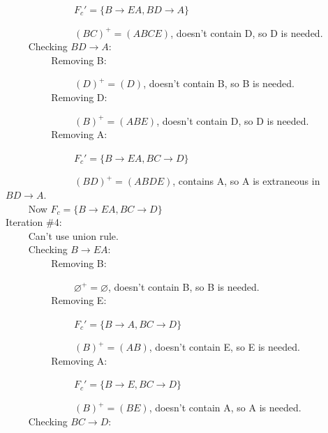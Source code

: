 \documentclass[a4paper]{article}
\begin{document}
	~~~~ ~~~~ ~~~~ $ F_c'=\{B\rightarrow EA, BD \rightarrow A\}$ 
	
	~~~~ ~~~~ ~~~~ $ (BC)^+=(ABCE) $, doesn't contain D, so D is needed. \\
		
	~~~~ Checking $BD\rightarrow A:$  \\
		
	~~~~ ~~~~ Removing B: 
	
	~~~~ ~~~~ ~~~~ $ (D)^+=(D) $, doesn't contain B, so B is needed. \\
		
	~~~~ ~~~~ Removing D: 
	
	~~~~ ~~~~ ~~~~ $ (B)^+=(ABE) $, doesn't contain D, so D is needed. \\
		
	~~~~ ~~~~ Removing A: 
	
	~~~~ ~~~~ ~~~~ $ F_c'=\{B\rightarrow EA, BC \rightarrow D\}$ 
	
	~~~~ ~~~~ ~~~~ $ (BD)^+=(ABDE) $, contains A, so A is extraneous in $BD\rightarrow A$. \\ 
	
	~~~~ Now $F_c = \{B \rightarrow EA, BC \rightarrow D\}$ \\
	
	Iteration \#4: \\
	
	~~~~ Can't use union rule. \\
	
	~~~~ Checking $B\rightarrow EA:$ \\ 
		
	~~~~ ~~~~ Removing B: 
	
	~~~~ ~~~~ ~~~~ $ \varnothing^+=\varnothing $, doesn't contain B, so B is needed. \\
		
	~~~~ ~~~~ Removing E: 
	
	~~~~ ~~~~ ~~~~ $ F_c'=\{B \rightarrow A, BC \rightarrow D\}$ 
	
	~~~~ ~~~~ ~~~~ $ (B)^+=(AB) $, doesn't contain E, so E is needed. \\
		
	~~~~ ~~~~ Removing A: 
	
	~~~~ ~~~~ ~~~~ $ F_c'=\{B\rightarrow E, BC \rightarrow D\}$ 
	
	~~~~ ~~~~ ~~~~ $ (B)^+=(BE) $, doesn't contain A, so A is needed. \\

	~~~~ Checking $BC\rightarrow D:$ \\
		
\end{document}
